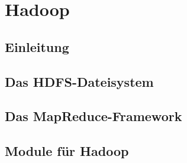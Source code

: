 \chapter{Hadoop}
\cite{Wartal2012}
\cite{Endlich2011}
\section{Einleitung}
\section{Das HDFS-Dateisystem}
\section{Das MapReduce-Framework}
\section{Module für Hadoop}